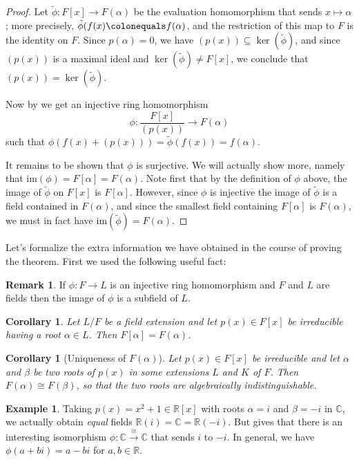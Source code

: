 \documentclass[12pt]{report}
\newtheorem{corollary}[theorem]{Corollary}
\numberwithin{equation}{section}
\numberwithin{theorem}{chapter}
\theoremstyle{definition}
\newtheorem{example}[theorem]{Example}
\newtheorem*{basic properties}{Basic Properties}
\newtheorem*{Important Remark}{Important Remark}
\newtheorem{remark}[theorem]{Remark}
\newcommand{\C}{\mathbb{C}}
\renewcommand{\ker}{\operatorname{ker}}
\begin{document}
\begin{proof}
Let $\tilde{\phi}\!: F[x] \to F(\alpha)$ be the evaluation homomorphism that sends $x \mapsto \alpha$; more precisely, $\tilde{\phi}(f(x) \colonequals f(\alpha)$, and the restriction of this map to $F$ is the identity on $F$. Since $p(\alpha)=0$, we have $(p(x)) \subseteq \ker({\tilde{\phi}})$, and since $(p(x))$ is a maximal ideal and $\ker({\tilde{\phi}}) \neq F[x]$, we conclude that $(p(x))=\ker({\tilde{\phi}})$. 

Now by  we get an injective ring homomorphism
$$\phi\!: \frac{F[x]}{(p(x))} \to F(\alpha)$$
such that $\phi(f(x)+(p(x)))=\tilde{\phi}(f(x))=f(\alpha)$.

It remains to be shown that $\phi$ is surjective. We will actually show more, namely that $\mathrm{im}(\phi)=F[\alpha]=F(\alpha)$. Note first that by the definition of $\phi$ above, the image of $\tilde{\phi}$ on $F[x]$ is $F[\alpha]$. However, since $\phi$ is injective the image of $\tilde{\phi}$ is a field contained in $F(\alpha)$, and since the smallest field containing $F[\alpha]$ is $F(\alpha)$, we must in fact have $\mathrm{im}({\tilde{\phi}})=F(\alpha)$.
\end{proof}



Let's formalize the extra information we have obtained in the course of proving the theorem. First we used the following useful fact:

\begin{remark}
If $\phi:F\to L$ is an injective ring homomorphism and $F$ and $L$ are fields then the image of $\phi$ is a subfield of $L$.
\end{remark}


\begin{corollary}
Let $L/F$ be a field extension and let $p(x) \in F[x]$ be irreducible having a root $\alpha \in L$. Then $F[\alpha] = F(\alpha)$.
\end{corollary}

\begin{corollary}[Uniqueness of $F(\alpha)$]\label{uniqueness of F(alpha) roots}
Let $p(x)\in F[x]$ be irreducible and let $\alpha$ and $\beta$ be two roots of $p(x)$ in some extensions $L$ and $K$ of $F$. Then $F(\alpha) \cong F(\beta)$, so that the two roots are algebraically indistinguishable.
\end{corollary}



\begin{example}
Taking $p(x)=x^2+1 \in \mathbb{R}[x]$ with roots $\alpha = i$ and $\beta=-i$ in $\C$, we actually obtain {\em equal} fields $\mathbb{R}(i)=\C=\mathbb{R}(-i)$.
But  gives that there is an interesting isomorphism $\phi: \C \xrightarrow{\, \cong \,} \C$ that sends $i$ to $-i$. In general, we have $\phi(a + b i) = a - bi$ for $a,b \in \mathbb{R}$.
\end{example}
\end{document}
